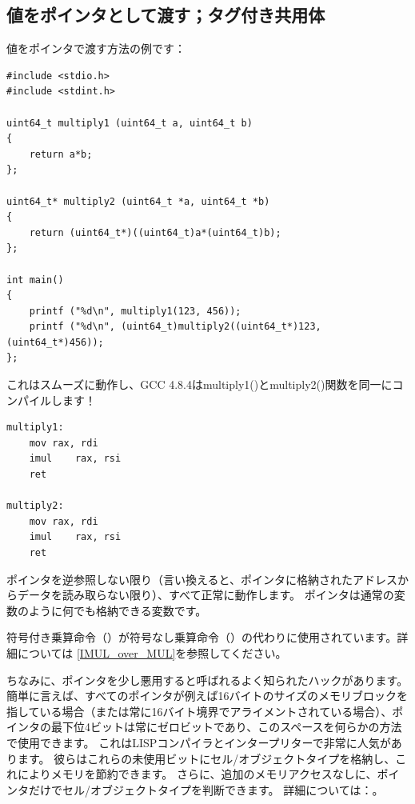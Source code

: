 \subsection{値をポインタとして渡す；タグ付き共用体}

値をポインタで渡す方法の例です：

\begin{lstlisting}[label=unsigned_multiply_C,style=customc]
#include <stdio.h>
#include <stdint.h>

uint64_t multiply1 (uint64_t a, uint64_t b)
{
	return a*b;
};

uint64_t* multiply2 (uint64_t *a, uint64_t *b)
{
	return (uint64_t*)((uint64_t)a*(uint64_t)b);
};

int main()
{
	printf ("%d\n", multiply1(123, 456));
	printf ("%d\n", (uint64_t)multiply2((uint64_t*)123, (uint64_t*)456));
};
\end{lstlisting}

これはスムーズに動作し、GCC 4.8.4はmultiply1()とmultiply2()関数を同一にコンパイルします！

\begin{lstlisting}[label=unsigned_multiply_lst,style=customasmx86]
multiply1:
	mov	rax, rdi
	imul	rax, rsi
	ret

multiply2:
	mov	rax, rdi
	imul	rax, rsi
	ret
\end{lstlisting}

ポインタを逆参照しない限り（言い換えると、ポインタに格納されたアドレスからデータを読み取らない限り）、すべて正常に動作します。
ポインタは通常の変数のように何でも格納できる変数です。

符号付き乗算命令（\IMUL）が符号なし乗算命令（\MUL）の代わりに使用されています。詳細については
\ref{IMUL_over_MUL}を参照してください。

ちなみに、ポインタを少し悪用すると呼ばれるよく知られたハックがあります。
簡単に言えば、すべてのポインタが例えば16バイトのサイズのメモリブロックを指している場合（または常に16バイト境界でアライメントされている場合）、ポインタの最下位4ビットは常にゼロビットであり、このスペースを何らかの方法で使用できます。
これはLISPコンパイラとインタープリターで非常に人気があります。
彼らはこれらの未使用ビットにセル/オブジェクトタイプを格納し、これによりメモリを節約できます。
さらに、追加のメモリアクセスなしに、ポインタだけでセル/オブジェクトタイプを判断できます。
詳細については：。

